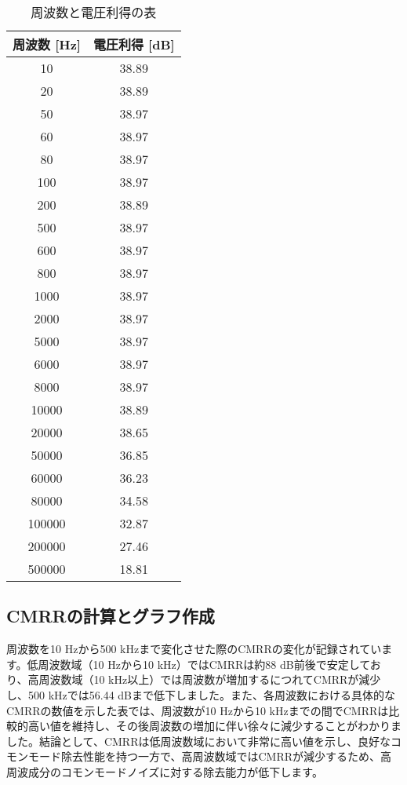 \documentclass[a4paper,11pt,xelatex,ja=standard]{bxjsarticle}
\begin{document}
        \begin{table}[H]
            \centering
            \begin{tabular}{|c|c|}
                \hline
                \textbf{周波数 [Hz]} & \textbf{電圧利得 [dB]} \\
                \hline
                10    & 38.89 \\
                20    & 38.89 \\
                50    & 38.97 \\
                60    & 38.97 \\
                80    & 38.97 \\
                100   & 38.97 \\
                200   & 38.89 \\
                500   & 38.97 \\
                600   & 38.97 \\
                800   & 38.97 \\
                1000  & 38.97 \\
                2000  & 38.97 \\
                5000  & 38.97 \\
                6000  & 38.97 \\
                8000  & 38.97 \\
                10000 & 38.89 \\
                20000 & 38.65 \\
                50000 & 36.85 \\
                60000 & 36.23 \\
                80000 & 34.58 \\
                100000 & 32.87 \\
                200000 & 27.46 \\
                500000 & 18.81 \\
                \hline
            \end{tabular}
            \caption{周波数と電圧利得の表}
        \end{table}

    \subsection{CMRRの計算とグラフ作成}
        周波数を10 Hzから500 kHzまで変化させた際のCMRRの変化が記録されています。低周波数域（10 Hzから10 kHz）ではCMRRは約88 dB前後で安定しており、高周波数域（10 kHz以上）では周波数が増加するにつれてCMRRが減少し、500 kHzでは56.44 dBまで低下しました。また、各周波数における具体的なCMRRの数値を示した表では、周波数が10 Hzから10 kHzまでの間でCMRRは比較的高い値を維持し、その後周波数の増加に伴い徐々に減少することがわかりました。結論として、CMRRは低周波数域において非常に高い値を示し、良好なコモンモード除去性能を持つ一方で、高周波数域ではCMRRが減少するため、高周波成分のコモンモードノイズに対する除去能力が低下します。
\end{document}
